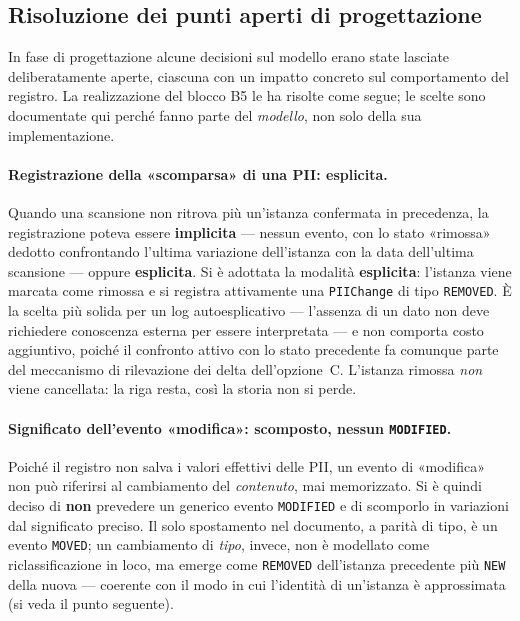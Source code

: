 \subsection{Risoluzione dei punti aperti di progettazione}
\label{sub:persistenza-punti-aperti}

In fase di progettazione alcune decisioni sul modello erano state lasciate deliberatamente aperte, ciascuna con un impatto concreto sul comportamento del registro. La realizzazione del blocco B5 le ha risolte come segue; le scelte sono documentate qui perché fanno parte del \emph{modello}, non solo della sua implementazione.

\paragraph{Registrazione della «scomparsa» di una PII: esplicita.} Quando una scansione non ritrova più un'istanza confermata in precedenza, la registrazione poteva essere \textbf{implicita} --- nessun evento, con lo stato «rimossa» dedotto confrontando l'ultima variazione dell'istanza con la data dell'ultima scansione --- oppure \textbf{esplicita}. Si è adottata la modalità \textbf{esplicita}: l'istanza viene marcata come rimossa e si registra attivamente una \texttt{PIIChange} di tipo \texttt{REMOVED}. È la scelta più solida per un log autoesplicativo --- l'assenza di un dato non deve richiedere conoscenza esterna per essere interpretata --- e non comporta costo aggiuntivo, poiché il confronto attivo con lo stato precedente fa comunque parte del meccanismo di rilevazione dei delta dell'opzione~C. L'istanza rimossa \emph{non} viene cancellata: la riga resta, così la storia non si perde.

\paragraph{Significato dell'evento «modifica»: scomposto, nessun \texttt{MODIFIED}.} Poiché il registro non salva i valori effettivi delle PII, un evento di «modifica» non può riferirsi al cambiamento del \textit{contenuto}, mai memorizzato. Si è quindi deciso di \textbf{non} prevedere un generico evento \texttt{MODIFIED} e di scomporlo in variazioni dal significato preciso. Il solo spostamento nel documento, a parità di tipo, è un evento \texttt{MOVED}; un cambiamento di \emph{tipo}, invece, non è modellato come riclassificazione in loco, ma emerge come \texttt{REMOVED} dell'istanza precedente più \texttt{NEW} della nuova --- coerente con il modo in cui l'identità di un'istanza è approssimata (si veda il punto seguente).

